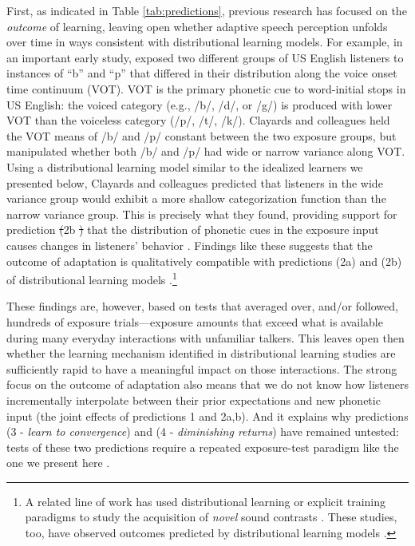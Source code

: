 \documentclass[
  11pt,
  man,mask,floatsintext]{apa6}
\makeatletter
\providecommand{\DIFdel}[1]{{\protect\color{red}\sout{#1}}} %
\providecommand{\DIFdelbegin}{} %
\providecommand{\DIFdelend}{} %
\newcommand{\DIFscaledelfig}{0.5}
\newlength{\DIFdelgraphicswidth} %
\newlength{\DIFdelgraphicsheight} %
\newcommand{\DIFdelincludegraphics}[2][]{%
\sbox{\DIFdelgraphicsbox}{\DIFOincludegraphics[#1]{#2}}%
\settoboxwidth{\DIFdelgraphicswidth}{\DIFdelgraphicsbox} %
\settoboxtotalheight{\DIFdelgraphicsheight}{\DIFdelgraphicsbox} %
\scalebox{\DIFscaledelfig}{%
\parbox[b]{\DIFdelgraphicswidth}{\usebox{\DIFdelgraphicsbox}\\[-\baselineskip] \rule{\DIFdelgraphicswidth}{0em}}\llap{\resizebox{\DIFdelgraphicswidth}{\DIFdelgraphicsheight}{%
\setlength{\unitlength}{\DIFdelgraphicswidth}%
\begin{picture}(1,1)%
\thicklines\linethickness{2pt} %
{\color[rgb]{1,0,0}\put(0,0){\framebox(1,1){}}}%
{\color[rgb]{1,0,0}\put(0,0){\line( 1,1){1}}}%
{\color[rgb]{1,0,0}\put(0,1){\line(1,-1){1}}}%
\end{picture}%
}\hspace*{3pt}}} %
} %
\DeclareRobustCommand{\DIFdelbegin}{\DIFOdelbegin \let\includegraphics\DIFdelincludegraphics} %
\DeclareRobustCommand{\DIFdelend}{\DIFOaddend \let\includegraphics\DIFOincludegraphics} %
\let\sout@orig\sout %
\renewcommand{\sout}[1]{\ifmmode\text{\sout@orig{\ensuremath{#1}}}\else\sout@orig{#1}\fi} %
\makeatother
\begin{document}
First, as indicated in Table \ref{tab:predictions}, previous research has focused on the \emph{outcome} of learning, leaving open whether adaptive speech perception unfolds over time in ways consistent with distributional learning models. For example, in an important early study, \textcite{clayards2008} exposed two different groups of US English listeners to instances of ``b'' and ``p'' that differed in their distribution along the voice onset time continuum (VOT). VOT is the primary phonetic cue to word-initial stops in US English: the voiced category (e.g., /b/, /d/, or /g/) is produced with lower VOT than the voiceless category (/p/, /t/, /k/). Clayards and colleagues held the VOT means of /b/ and /p/ constant between the two exposure groups, but manipulated whether both /b/ and /p/ had wide or narrow variance along VOT. Using a distributional learning model similar to the idealized learners we presented below, Clayards and colleagues predicted that listeners in the wide variance group would exhibit a more shallow categorization function than the narrow variance group. This is precisely what they found, providing support for prediction \DIFdelbegin \DIFdel{(}\DIFdelend 2b \DIFdelbegin \DIFdel{) }\DIFdelend that the distribution of phonetic cues in the exposure input causes changes in listeners' behavior \autocites[see also][]{nixon2016,theodore-monto2019}. Findings like these suggests that the outcome of adaptation is qualitatively compatible with predictions (2a) and (2b) of distributional learning models \autocites[see also][]{hitczenko-feldman2016,tan2021,xie2021cognition}.\footnote{A related line of work has used distributional learning or explicit training paradigms to study the acquisition of \emph{novel} sound contrasts \autocites[e.g.,][]{maye2002,mcclelland1999,pajak-levy2012,pisoni1982}. These studies, too, have observed outcomes predicted by distributional learning models \autocite[for review, see][]{pajak2016}.}

These findings are, however, based on tests that averaged over, and/or followed, hundreds of exposure trials---exposure amounts that exceed what is available during many everyday interactions with unfamiliar talkers. This leaves open then whether the learning mechanism identified in distributional learning studies are sufficiently rapid to have a meaningful impact on those interactions. The strong focus on the outcome of adaptation also means that we do not know how listeners incrementally interpolate between their prior expectations and new phonetic input (the joint effects of predictions 1 and 2a,b). And it explains why predictions (3 - \emph{learn to convergence}) and (4 - \emph{diminishing returns}) have remained untested: tests of these two predictions require a repeated exposure-test paradigm like the one we present here \autocites[for discussion, see][]{cummings-theodore2023,kleinschmidt2020}.
\end{document}
